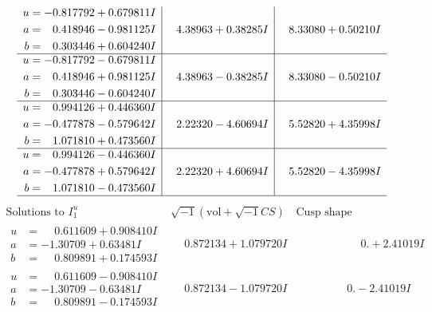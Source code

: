 \documentclass[1p]{elsarticle_modified}
\theoremstyle{definition}
\newcommand{\I}{\sqrt{-1}}
\begin{document}
$$\begin{array}{c|c|c}
\begin{aligned}
u &= -0.817792 + 0.679811 I \\
a &= \phantom{-}0.418946 - 0.981125 I \\
b &= \phantom{-}0.303446 + 0.604240 I\end{aligned}
 & \phantom{-}4.38963 + 0.38285 I & \phantom{-}8.33080 + 0.50210 I \\ \hline\begin{aligned}
u &= -0.817792 - 0.679811 I \\
a &= \phantom{-}0.418946 + 0.981125 I \\
b &= \phantom{-}0.303446 - 0.604240 I\end{aligned}
 & \phantom{-}4.38963 - 0.38285 I & \phantom{-}8.33080 - 0.50210 I \\ \hline\begin{aligned}
u &= \phantom{-}0.994126 + 0.446360 I \\
a &= -0.477878 - 0.579642 I \\
b &= \phantom{-}1.071810 + 0.473560 I\end{aligned}
 & \phantom{-}2.22320 - 4.60694 I & \phantom{-}5.52820 + 4.35998 I \\ \hline\begin{aligned}
u &= \phantom{-}0.994126 - 0.446360 I \\
a &= -0.477878 + 0.579642 I \\
b &= \phantom{-}1.071810 - 0.473560 I\end{aligned}
 & \phantom{-}2.22320 + 4.60694 I & \phantom{-}5.52820 - 4.35998 I\\
 \hline 
 \end{array}$$\newpage$$\begin{array}{c|c|c}  
\text{Solutions to }I^u_{1}& \I (\text{vol} + \sqrt{-1}CS) & \text{Cusp shape}\\
 \hline 
\begin{aligned}
u &= \phantom{-}0.611609 + 0.908410 I \\
a &= -1.30709 + 0.63481 I \\
b &= \phantom{-}0.809891 + 0.174593 I\end{aligned}
 & \phantom{-}0.872134 + 1.079720 I & \phantom{-0.000000 -}0. + 2.41019 I \\ \hline\begin{aligned}
u &= \phantom{-}0.611609 - 0.908410 I \\
a &= -1.30709 - 0.63481 I \\
b &= \phantom{-}0.809891 - 0.174593 I\end{aligned}
 & \phantom{-}0.872134 - 1.079720 I & \phantom{-0.000000 } 0. - 2.41019 I \\ \hline\begin{aligned}

\end{aligned}
\end{array}$$
\end{document}
